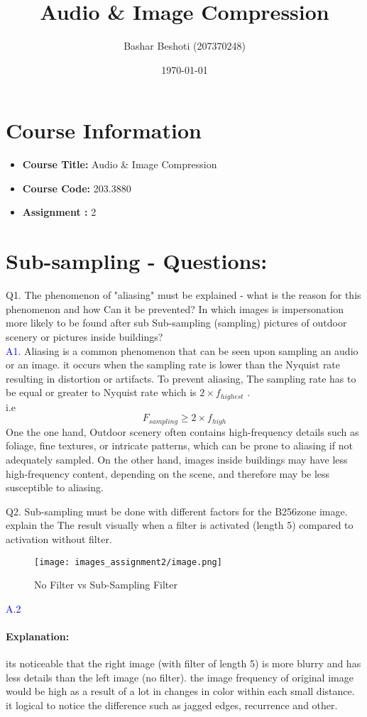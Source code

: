 \documentclass[letterpaper, 12pt]{article}
\title{Audio \& Image Compression}
\author{Bashar Beshoti (207370248)
}
\date{\today}
\begin{document}
\maketitle

\section*{Course Information}
\begin{itemize}
    \item \textbf{Course Title:} Audio \& Image Compression  %
    \item \textbf{Course Code:} 203.3880
    \item \textbf{Assignment :} 2
\end{itemize}

\newpage
\section{Sub-sampling - Questions:}
Q1. The phenomenon of "aliasing" must be explained - what is the reason for this phenomenon and how Can it be prevented? In which images is impersonation more likely to be found after sub
Sub-sampling (sampling) pictures of outdoor scenery or pictures inside buildings? \\

\textcolor{blue}{A1.} Aliasing is a common phenomenon that can be seen upon sampling an audio or an image. it occurs when the sampling rate is lower than the Nyquist rate resulting in distortion or artifacts. To prevent aliasing, The sampling rate has to be equal or greater to Nyquist rate which is $2 \times f_{highest}$ . \\
i.e \\
\[F_{sampling} \geq 2\times f_{high}\]
One the one hand, Outdoor scenery often contains high-frequency details such as foliage, fine textures, or intricate patterns, which can be prone to aliasing if not adequately sampled. On the other hand, images inside buildings may have less high-frequency content, depending on the scene, and therefore may be less susceptible to aliasing. 

Q2. Sub-sampling must be done with different factors for the B256zone image. explain the
The result visually when a filter is activated (length 5) compared to activation without
filter. \\
\begin{figure}[htbp]
    \centering
    \texttt{[image: images\_assignment2/image.png]}
    \caption{No Filter vs Sub-Sampling Filter}
\end{figure}
\textcolor{blue}{A.2}\paragraph{ Explanation:} its noticeable that the right image (with filter of length 5) is more blurry and has less details than the left image (no filter). the image frequency of original image would be high as a result of a lot in changes in color within each small distance. it logical to notice the difference such as jagged edges, recurrence  and other.   \\
\end{document}
